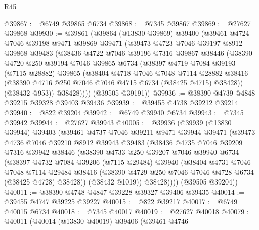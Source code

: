 \begin{lexlean}{R45}
\begin{coremodule}
{@39867 := @6749 @39865 @6734
@39868 := @7345 @39867
@39869 := @27627 @39868
@39930 := @39861
    (@39864
      (@13830 @39869)
      @39400
      (@39461
        @4724
        @7046
        @39198
        @9471
        @39869
        @39471
        (@39473
          @4723
          @7046
          @39197
          @8912
          @39868
          @39483
          (@38436
            @4722
            @7046
            @39196
            @7316
            @39867
            @38446
            (@38390
              @4720
              @250
              @39194
              @7046
              @39865
              @6734
              (@38397
                @4719
                @7084
                @39193
                (@7115 @28882)
                @39865
                (@38404
                  @4718
                  @7046
                  @7048
                  @7114
                  @28882
                  @38416
                  (@38390 @4716 @250 @7046 @7046 @4715 @6734 (@38425 @4715) @38428))
                (@38432 @953))
              @38428))))
      (@39505 @39191))
@39936 := @38390 @4739 @4848 @39215 @39328 @39403 @39436
@39939 := @39455 @4738 @39212 @39214
@39940 := @822 @39204
@39942 := @6749 @39940 @6734
@39943 := @7345 @39942
@39944 := @27627 @39943
@40005 := @39936
    (@39939
      (@13830 @39944)
      @39403
      (@39461
        @4737
        @7046
        @39211
        @9471
        @39944
        @39471
        (@39473
          @4736
          @7046
          @39210
          @8912
          @39943
          @39483
          (@38436
            @4735
            @7046
            @39209
            @7316
            @39942
            @38446
            (@38390
              @4733
              @250
              @39207
              @7046
              @39940
              @6734
              (@38397
                @4732
                @7084
                @39206
                (@7115 @29484)
                @39940
                (@38404
                  @4731
                  @7046
                  @7048
                  @7114
                  @29484
                  @38416
                  (@38390 @4729 @250 @7046 @7046 @4728 @6734 (@38425 @4728) @38428))
                (@38432 @1019))
              @38428))))
      (@39505 @39204))
@40011 := @38390 @4748 @4847 @39228 @39327 @39406 @39435
@40014 := @39455 @4747 @39225 @39227
@40015 := @822 @39217
@40017 := @6749 @40015 @6734
@40018 := @7345 @40017
@40019 := @27627 @40018
@40079 := @40011
    (@40014
      (@13830 @40019)
      @39406
      (@39461
        @4746
}
\end{coremodule}
\end{lexlean}
